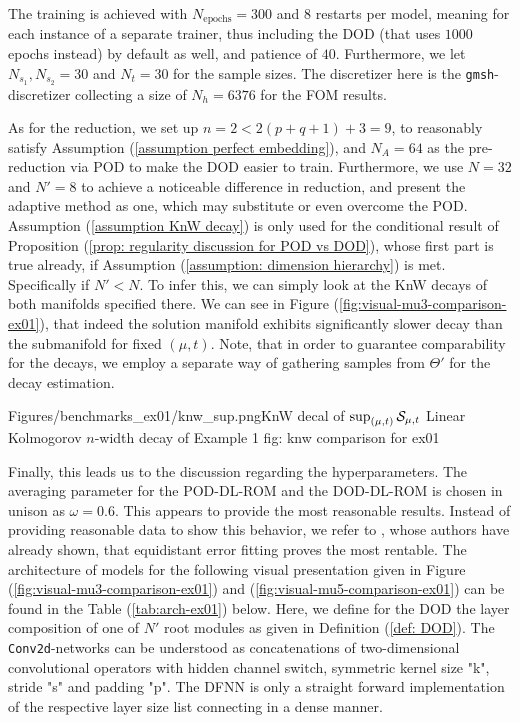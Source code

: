 The training is achieved with $N_\text{epochs} = 300$ and $8$ restarts per model, meaning for each instance of 
a separate trainer, thus including the DOD (that uses $1000$ epochs instead) by 
default as well, and patience of $40$. Furthermore,
we let $N_{s_1}, N_{s_2}= 30$ and $N_t = 30$ for the sample sizes. The discretizer here is the 
\texttt{gmsh}-discretizer collecting a size of $N_h = 6376$ for the FOM results.

As for the reduction, we set up $n = 2 < 2(p+q+1) + 3 = 9$, to reasonably satisfy Assumption 
(\ref{assumption perfect embedding}), and $N_A = 64$ as the pre-reduction via POD to make
the DOD easier to train. Furthermore, we use $N = 32$ and $N' = 8$ to achieve a noticeable difference in reduction, 
and present the adaptive method as one, which may substitute or even overcome the POD. 
Assumption (\ref{assumption KnW decay}) is only used for the conditional result of 
Proposition (\ref{prop: regularity discussion for POD vs DOD}), whose first part
is true already, if Assumption (\ref{assumption: dimension hierarchy}) is met. Specifically if
$N' < N$. To infer this, we can simply look at the KnW decays of both manifolds specified there.
We can see in Figure (\ref{fig:visual-mu3-comparison-ex01}), that indeed the solution manifold exhibits significantly slower decay than 
the submanifold for fixed $(\mu, t)$. Note, that in order to guarantee
comparability for the decays, we employ a separate way of gathering samples from $\Theta'$ for the
decay estimation.


%
    {Figures/benchmarks_ex01/knw_sup.png}{KnW decal of $\sup_{(\mu, t)} \mathcal{S}_{\mu, t}$}%
    {Linear Kolmogorov $n$-width decay of Example 1}
    {fig: knw comparison for ex01}

Finally, this leads us to the discussion regarding the hyperparameters. The averaging
parameter for the POD-DL-ROM and the DOD-DL-ROM is chosen in unison as $\omega=0.6$. This
appears to provide the most reasonable results. Instead of providing reasonable data to show this behavior,
we refer to \cite[p. 21--22]{fresca2020}, whose authors have already shown, that equidistant error
fitting proves the most rentable. The architecture of models for the following visual presentation given in 
Figure (\ref{fig:visual-mu3-comparison-ex01}) and (\ref{fig:visual-mu5-comparison-ex01}) 
can be found in the Table (\ref{tab:arch-ex01}) below. 
Here, we define for the DOD the layer composition of one of $N'$ root modules as given in Definition
(\ref{def: DOD}). The \texttt{Conv2d}-networks can be understood as concatenations of
two-dimensional convolutional operators with hidden channel switch, symmetric kernel size "k", stride "s"
and padding "p". The DFNN is only a straight forward implementation of the respective layer size list 
connecting in a dense manner.

